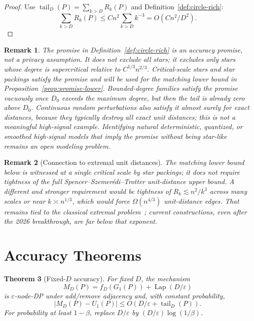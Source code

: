 \documentclass[11pt]{article}
\newtheorem{theorem}{Theorem}[section]
\newtheorem{remark}[theorem]{Remark}
\DeclareMathOperator{\Lap}{Lap}
\newcommand{\eps}{\varepsilon}
\newcommand{\tail}{\operatorname{tail}}
\begin{document}
\begin{proof}
Use \(\tail_D(P)=\sum_{k>D}R_k(P)\) and Definition~\ref{def:circle-rich}:
\[
\sum_{k>D}R_k(P)\le Cn^2\sum_{k>D}k^{-3}=O(Cn^2/D^2).
\]
\end{proof}

\begin{remark}
The promise in Definition~\ref{def:circle-rich} is an accuracy promise, not a privacy assumption. It does not exclude all stars; it excludes only stars whose degree is supercritical relative to \(C^{1/3}n^{2/3}\). Critical-scale stars and star packings satisfy the promise and will be used for the matching lower bound in Proposition~\ref{prop:promise-lower}. Bounded-degree families satisfy the promise vacuously once \(D_0\) exceeds the maximum degree, but then the tail is already zero above \(D_0\). Continuous random perturbations also satisfy it almost surely for exact distances, because they typically destroy all exact unit distances; this is not a meaningful high-signal example. Identifying natural deterministic, quantized, or smoothed high-signal models that imply the promise without being star-like remains an open modeling problem.
\end{remark}

\begin{remark}[Connection to extremal unit distances]
\label{rem:sst-tight}
The matching lower bound below is witnessed at a single critical scale by star packings; it does not require tightness of the full Spencer--Szemerédi--Trotter unit-distance upper bound. A different and stronger requirement would be tightness of \(R_k\lesssim n^2/k^3\) across many scales or near \(k\asymp n^{1/3}\), which would force \(\Omega(n^{4/3})\) unit-distance edges. That remains tied to the classical extremal problem~\cite{SpencerSzemerediTrotter84}; current constructions, even after the 2026 breakthrough, are far below that exponent.
\end{remark}

\section{Accuracy Theorems}

\begin{theorem}[Fixed-\(D\) accuracy]
\label{thm:fixedD}
For fixed \(D\), the mechanism
\[
M_D(P)=f_D(G_1(P))+\Lap(D/\eps)
\]
is \(\eps\)-node-DP under add/remove adjacency and, with constant probability,
\[
|M_D(P)-U_1(P)|\le O(D/\eps+\tail_D(P)).
\]
For probability at least \(1-\beta\), replace \(D/\eps\) by \((D/\eps)\log(1/\beta)\).
\end{theorem}
\end{document}
